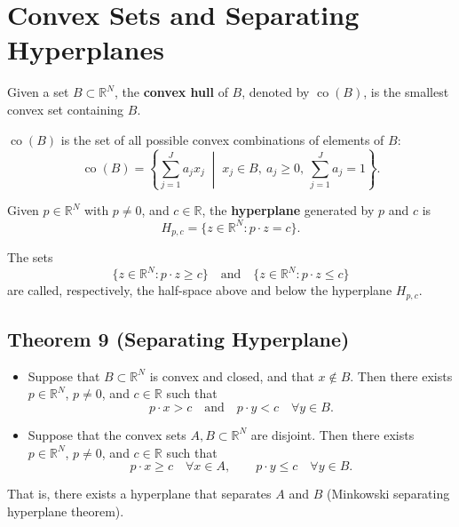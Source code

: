 \section{Convex Sets and Separating Hyperplanes}

Given a set $B \subset \mathbb{R}^N$, the \textbf{convex hull} of $B$,
denoted by $\operatorname{co}(B)$, is the smallest convex set containing $B$.


$\operatorname{co}(B)$ is the set of all possible convex combinations of elements of $B$:
\[
\operatorname{co}(B)
=
\left\{
\sum_{j=1}^J a_j x_j
\;\middle|\;
x_j \in B,\ a_j \ge 0,\ \sum_{j=1}^J a_j = 1
\right\}.
\]

\vspace{1em}

Given $p \in \mathbb{R}^N$ with $p \ne 0$, and $c \in \mathbb{R}$,
the \textbf{hyperplane} generated by $p$ and $c$ is
\[
H_{p,c} = \{ z \in \mathbb{R}^N : p \cdot z = c \}.
\]

The sets
\[
\{ z \in \mathbb{R}^N : p \cdot z \ge c \}
\quad \text{and} \quad
\{ z \in \mathbb{R}^N : p \cdot z \le c \}
\]
are called, respectively, the half-space above and below the hyperplane $H_{p,c}$.


\begin{tcolorbox}[breakable, colback=white]

\subsection*{Theorem 9 (Separating Hyperplane)}

\begin{itemize}
    \item[(i)] Suppose that $B \subset \mathbb{R}^N$ is convex and closed,
    and that $x \notin B$. Then there exists $p \in \mathbb{R}^N$, $p \ne 0$,
    and $c \in \mathbb{R}$ such that
    \[
    p \cdot x > c
    \quad \text{and} \quad
    p \cdot y < c \quad \forall y \in B.
    \]

    \item[(ii)] Suppose that the convex sets $A,B \subset \mathbb{R}^N$ are disjoint.
    Then there exists $p \in \mathbb{R}^N$, $p \ne 0$, and $c \in \mathbb{R}$ such that
    \[
    p \cdot x \ge c \quad \forall x \in A,
    \qquad
    p \cdot y \le c \quad \forall y \in B.
    \]
\end{itemize}

That is, there exists a hyperplane that separates $A$ and $B$
(Minkowski separating hyperplane theorem).

\end{tcolorbox}


